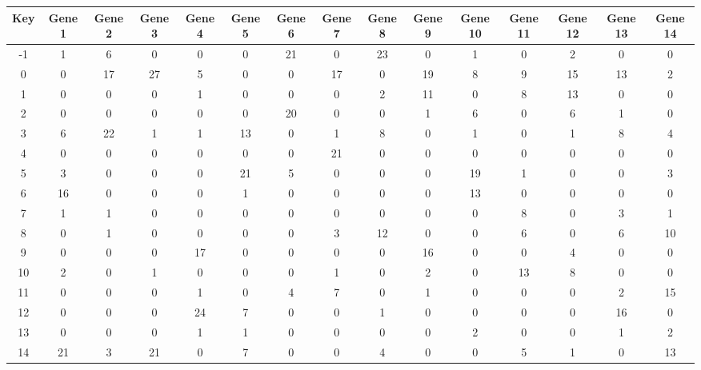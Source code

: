 \begin{tabular}{|c|c|c|c|c|c|c|c|c|c|c|c|c|c|c|}
\hline
Key & Gene 1 & Gene 2 & Gene 3 & Gene 4 & Gene 5 & Gene 6 & Gene 7 & Gene 8 & Gene 9 & Gene 10 & Gene 11 & Gene 12 & Gene 13 & Gene 14 \\
\hline
-1 & 1 & 6 & 0 & 0 & 0 & 21 & 0 & 23 & 0 & 1 & 0 & 2 & 0 & 0 \\
0 & 0 & 17 & 27 & 5 & 0 & 0 & 17 & 0 & 19 & 8 & 9 & 15 & 13 & 2 \\
1 & 0 & 0 & 0 & 1 & 0 & 0 & 0 & 2 & 11 & 0 & 8 & 13 & 0 & 0 \\
2 & 0 & 0 & 0 & 0 & 0 & 20 & 0 & 0 & 1 & 6 & 0 & 6 & 1 & 0 \\
3 & 6 & 22 & 1 & 1 & 13 & 0 & 1 & 8 & 0 & 1 & 0 & 1 & 8 & 4 \\
4 & 0 & 0 & 0 & 0 & 0 & 0 & 21 & 0 & 0 & 0 & 0 & 0 & 0 & 0 \\
5 & 3 & 0 & 0 & 0 & 21 & 5 & 0 & 0 & 0 & 19 & 1 & 0 & 0 & 3 \\
6 & 16 & 0 & 0 & 0 & 1 & 0 & 0 & 0 & 0 & 13 & 0 & 0 & 0 & 0 \\
7 & 1 & 1 & 0 & 0 & 0 & 0 & 0 & 0 & 0 & 0 & 8 & 0 & 3 & 1 \\
8 & 0 & 1 & 0 & 0 & 0 & 0 & 3 & 12 & 0 & 0 & 6 & 0 & 6 & 10 \\
9 & 0 & 0 & 0 & 17 & 0 & 0 & 0 & 0 & 16 & 0 & 0 & 4 & 0 & 0 \\
10 & 2 & 0 & 1 & 0 & 0 & 0 & 1 & 0 & 2 & 0 & 13 & 8 & 0 & 0 \\
11 & 0 & 0 & 0 & 1 & 0 & 4 & 7 & 0 & 1 & 0 & 0 & 0 & 2 & 15 \\
12 & 0 & 0 & 0 & 24 & 7 & 0 & 0 & 1 & 0 & 0 & 0 & 0 & 16 & 0 \\
13 & 0 & 0 & 0 & 1 & 1 & 0 & 0 & 0 & 0 & 2 & 0 & 0 & 1 & 2 \\
14 & 21 & 3 & 21 & 0 & 7 & 0 & 0 & 4 & 0 & 0 & 5 & 1 & 0 & 13 \\
\hline
\end{tabular}